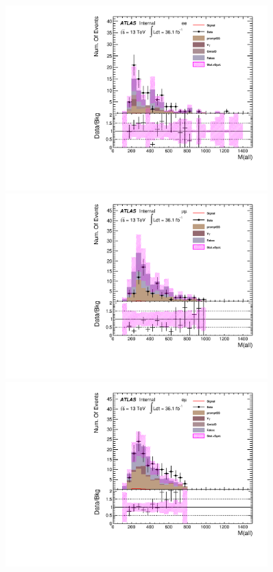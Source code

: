 \begin{figure}[h]
\begin{minipage}[t]{0.33\linewidth}
 \centering
 \includegraphics[width=0.9\textwidth,angle=-90]{fig/SigOpt/mH300_m_all_ee.pdf}
 \end{minipage}
 \begin{minipage}[t]{0.33\linewidth}
 \centering
 \includegraphics[width=0.9\textwidth,angle=-90]{fig/SigOpt/mH300_m_all_mumu.pdf}
 \end{minipage}
 \begin{minipage}[t]{0.33\linewidth}
 \centering
 \includegraphics[width=0.9\textwidth,angle=-90]{fig/SigOpt/mH300_m_all_emu.pdf}

\end{minipage}
\end{figure}
